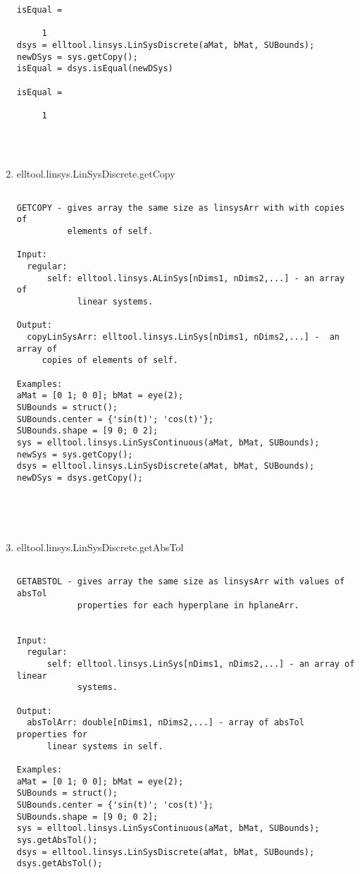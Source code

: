 \begin{enumerate}
\begin{lstlisting}
isEqual =

     1
dsys = elltool.linsys.LinSysDiscrete(aMat, bMat, SUBounds);
newDSys = sys.getCopy();
isEqual = dsys.isEqual(newDSys)

isEqual =

     1




\end{lstlisting}
\fontfamily{\familydefault}
\selectfont
\item {elltool.linsys.LinSysDiscrete.getCopy}
\selectfont
\begin{lstlisting}

GETCOPY - gives array the same size as linsysArr with with copies of
          elements of self.

Input:
  regular:
      self: elltool.linsys.ALinSys[nDims1, nDims2,...] - an array of
            linear systems.

Output:
  copyLinSysArr: elltool.linsys.LinSys[nDims1, nDims2,...] -  an array of
     copies of elements of self.

Examples:
aMat = [0 1; 0 0]; bMat = eye(2);
SUBounds = struct();
SUBounds.center = {'sin(t)'; 'cos(t)'};
SUBounds.shape = [9 0; 0 2];
sys = elltool.linsys.LinSysContinuous(aMat, bMat, SUBounds);
newSys = sys.getCopy();
dsys = elltool.linsys.LinSysDiscrete(aMat, bMat, SUBounds);
newDSys = dsys.getCopy();





\end{lstlisting}
\fontfamily{\familydefault}
\selectfont
\item {elltool.linsys.LinSysDiscrete.getAbsTol}
\selectfont
\begin{lstlisting}

GETABSTOL - gives array the same size as linsysArr with values of absTol
            properties for each hyperplane in hplaneArr.


Input:
  regular:
      self: elltool.linsys.LinSys[nDims1, nDims2,...] - an array of linear
            systems.

Output:
  absTolArr: double[nDims1, nDims2,...] - array of absTol properties for
      linear systems in self.

Examples:
aMat = [0 1; 0 0]; bMat = eye(2);
SUBounds = struct();
SUBounds.center = {'sin(t)'; 'cos(t)'};
SUBounds.shape = [9 0; 0 2];
sys = elltool.linsys.LinSysContinuous(aMat, bMat, SUBounds);
sys.getAbsTol();
dsys = elltool.linsys.LinSysDiscrete(aMat, bMat, SUBounds);
dsys.getAbsTol();





\end{lstlisting}
\end{enumerate}

